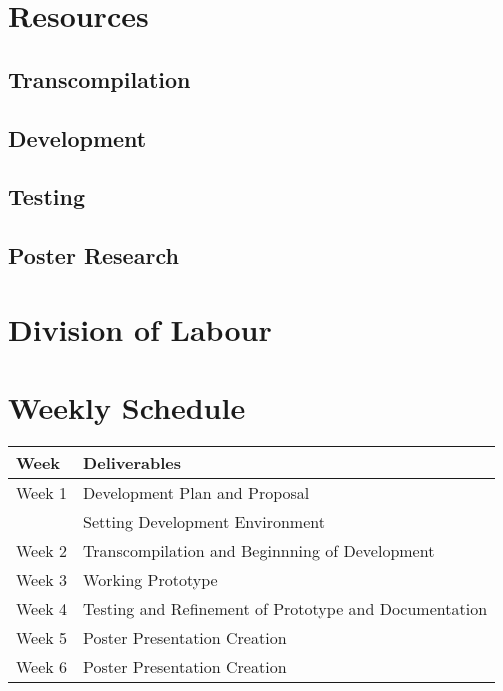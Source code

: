 \documentclass{article}
\begin{document}
\section{Resources}

\subsection{Transcompilation} %

\subsection{Development} %

\subsection{Testing} %

\subsection{Poster Research} %

\section{Division of Labour} %

\section{Weekly Schedule} %

\begin{tabular}{ l | l }
  \textbf{Week} & \textbf{Deliverables} \\
  \hline
  \hline
  Week 1 & Development Plan and Proposal\\
         & Setting Development Environment\\ 
  Week 2 & Transcompilation and Beginnning of Development\\
  Week 3 & Working Prototype\\
  Week 4 & Testing and Refinement of Prototype and Documentation\\
  Week 5 & Poster Presentation Creation\\
  Week 6 & Poster Presentation Creation\\
\end{tabular}

\end{document}
